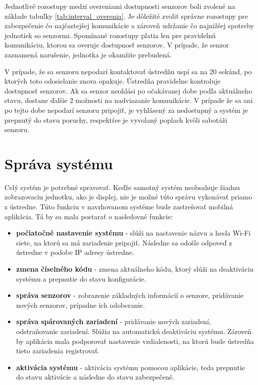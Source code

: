 Jednotlivé rozostupy medzi overeniami dostupnosti senzorov boli zvolené na základe tabuľky \ref{tab:interval_overenia}. Je dôležité zvoliť správne rozostupy pre zabezpečenie čo najčastejšej komunikácie a zároveň udržanie čo najnižšej spotreby jednotiek so senzormi. Spomínané rozostupy platia len pre pravidelnú komunikáciu, ktorou sa overuje dostupnosť senzorov. V prípade, že senzor zaznamená narušenie, jednotka je okamžite prebudená.

V prípade, že sa senzoru nepodarí kontaktovať ústredňu uspí sa na 20 sekúnd, po ktorých toto odosielanie znova opakuje. Ústredňa pravidelne kontroluje dostupnosť senzorov. Ak sa senzor neohlási po očakávanej dobe podľa aktuálneho stavu, dostane ďalšie 2 možnosti na nadviazanie komunikácie. V prípade že sa ani po tejto dobe nepodarí senzoru pripojiť, je vyhlásený za nedostupný a systém je prepnutý do stavu poruchy, respektíve je vyvolaný poplach kvôli sabotáži senzoru.

\section{Správa systému}

Celý systém je potrebné spravovať. Keďže samotný systém neobsahuje žiadnu zobrazovaciu jednotku, ako je displej, nie je možné túto správu vykonávať priamo z ústredne. Túto funkciu v navrhovanom systéme bude zastrešovať mobilná aplikácia. Tá by sa mala postarať o nasledovné funkcie:
\begin{itemize}
    \item \textbf{počiatočné nastavenie systému} - slúži na nastavenie názvu a hesla Wi-Fi siete, na ktorú sa má zariadenie pripojiť. Následne sa odošle odpoveď z ústredne v podobe IP adresy ústredne.
    \item \textbf{zmena číselného kódu} - zmena aktuálneho kódu, ktorý slúži na deaktiváciu systému a prepnutie do stavu konfigurácie.
    \item \textbf{správa senzorov} - zobrazenie základných informácií o senzore, pridávanie nových senzorov, prípadne ich odoberanie.
    \item \textbf{správa spárovaných zariadení} - pridávanie nových zariadení, odstraňovanie zariadení. Slúžia na automatickú deaktiváciu systému. Zároveň by aplikácia mala podporovať nastavenie vzdialenosti, na ktorú bude ústredňa tieto zariadenia registrovať.
    \item \textbf{aktivácia systému} - aktivácia systému pomocou aplikácie, teda prepnutie do stavu aktivácie a následne do stavu zabezpečené.
\end{itemize}

